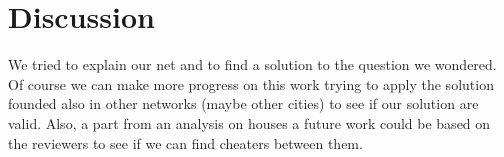 \documentclass[sigchi]{acmart}
\begin{document}
\section{Discussion}
We tried to explain our net and to find a solution to the question we wondered. Of course we can make more progress on this work trying to apply the solution founded also in other networks (maybe other cities) to see if our solution are valid.\newline
Also, a part from an analysis on houses a future work could be based on the reviewers to see if we can find cheaters between them.





\end{document}
